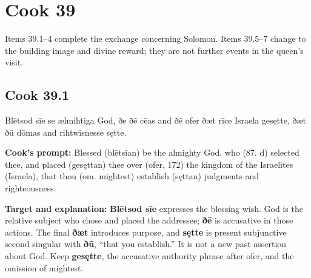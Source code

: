 \clearpage
\section*{Cook 39}

Items 39.1–4 complete the exchange concerning Solomon. Items 39.5–7 change to the building image and divine reward; they are not further events in the queen's visit.

\par\begin{minipage}{\linewidth}\raggedright
\subsection*{Cook 39.1}

Blētsod sīe se ælmihtiga God, ðe ðē cēas and ðē ofer ðæt rīce Israela gesętte, ðæt ðū dōmas and rihtwīsnesse sętte.

\textbf{Cook's prompt:} Blessed (blētsian) be the almighty God, who (87. d) selected thee, and placed (gesęttan) thee over (ofer, 172) the kingdom of the Israelites (Israela), that thou (om. mightest) establish (sęttan) judgments and righteousness.

\textbf{Target and explanation:} \textbf{Blētsod sīe} expresses the blessing wish. God is the relative subject who chose and placed the addressee; \textbf{ðē} is accusative in those actions. The final \textbf{ðæt} introduces purpose, and \textbf{sętte} is present subjunctive second singular with \textbf{ðū}, “that you establish.” It is not a new past assertion about God. Keep \textbf{gesętte}, the accusative authority phrase after ofer, and the omission of mightest.

\end{minipage}\par\addvspace{4pt}

